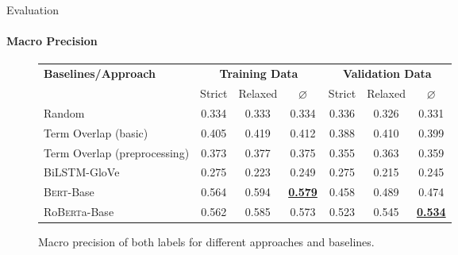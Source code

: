 \documentclass[english,handout]{mlutalk}
\newcommand{\BiLSTM}{\mbox{BiLSTM}\xspace}
\newcommand{\Bert}{\textsc{Bert}\xspace}
\newcommand{\BertBase}{\Bert-Base\xspace}
\newcommand{\Roberta}{\mbox{Ro\textsc{Bert}a}\xspace}
\newcommand{\RobertaBase}{\Roberta-Base\xspace}
\renewcommand{\lg}{\color{lightgray}}
\begin{document}
\begin{frame}{Evaluation}
  \framesubtitle{Macro Precision}
  \begin{figure}
    \centering
    \caption{Macro precision of both labels for different approaches and baselines.}
    \scriptsize
    \begin{tabular}{lcccccc}
      \toprule
      \textbf{Baselines/Approach} & \multicolumn{3}{c}{\textbf{Training Data}} & \multicolumn{3}{c}{\textbf{Validation Data}} \\
      \cmidrule(r{0.5em}){2-4} \cmidrule(l{0.5em}){5-7}
      & Strict & Relaxed & \(\varnothing\) & Strict & Relaxed & \(\varnothing\) \\
      \midrule
      Random 
      & 0.334 & 0.333 & 0.334 & 0.336 & 0.326 & 0.331 \\
      Term Overlap (basic)
      & 0.405 & 0.419 & 0.412 & 0.388 & 0.410 & 0.399 \\
      Term Overlap (preprocessing)
      & 0.373 & 0.377 & 0.375 & 0.355 & 0.363 & 0.359 \\
      \midrule
      \lg\BiLSTM-GloVe
      & \lg0.275 & \lg0.223 & \lg0.249 & \lg0.275 & \lg0.215 & \lg0.245 \\
      \BertBase
      & 0.564 & 0.594 & \textbf{\underline{0.579}} & 0.458 & 0.489 & 0.474 \\
      \RobertaBase
      & 0.562 & 0.585 & 0.573 & 0.523 & 0.545 & \textbf{\underline{0.534}} \\
      \bottomrule
    \end{tabular}
  \end{figure}
\end{frame}
\end{document}
